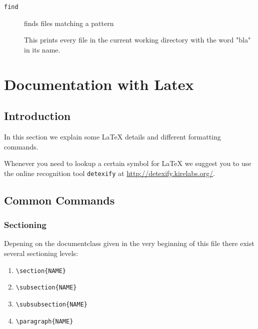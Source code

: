 \documentclass[10pt,a4paper]{scrartcl}
\begin{document}
\begin{description}
\item[\texttt{find}] finds files matching a pattern
This prints every file in the current working directory with the word "bla" in its name.

\end{description}

\section{Documentation with Latex}
\subsection{Introduction} 

In this section we explain some \LaTeX\xspace details and different formatting
commands.

Whenever you need to lookup a certain symbol for \LaTeX\xspace we suggest you to use
the online recognition tool \texttt{detexify} at \url{http://detexify.kirelabs.org/}.


\subsection{Common Commands}
\subsubsection{Sectioning}
Depening on the documentclass given in the very beginning of this file there
exist several sectioning levels:
\begin{enumerate}
	\item{} \verb$\section{NAME}$
	\item{} \verb$\subsection{NAME}$
	\item{} \verb$\subsubsection{NAME}$
	\item{} \verb$\paragraph{NAME}$
\end{enumerate}
\end{document}
